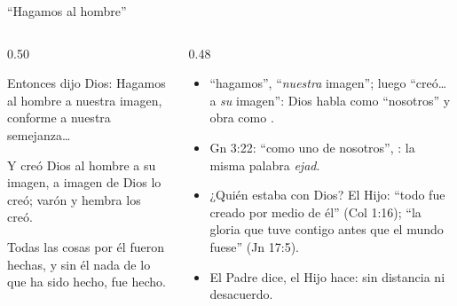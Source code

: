 \begin{frame}{``Hagamos al hombre''}
\begin{columns}[t,onlytextwidth]
\begin{column}{0.50\textwidth}
\begin{center}\small{}\end{center}
\begin{cita}[fontupper=\scriptsize\itshape]Entonces dijo Dios: Hagamos al hombre a nuestra imagen, conforme a nuestra semejanza\ldots{}\end{cita}
\begin{cita}[fontupper=\scriptsize\itshape]Y creó Dios al hombre a su imagen, a imagen de Dios lo creó; varón y hembra los creó.\end{cita}
\begin{cita}[fontupper=\scriptsize\itshape]Todas las cosas por él fueron hechas, y sin él nada de lo que ha sido hecho, fue hecho.\end{cita}
\end{column}
\begin{column}{0.48\textwidth}\small
\begin{itemize}
\item {} ``hagamos'', ``\emph{nuestra} imagen''; luego ``creó\ldots{} a \emph{su} imagen'': Dios habla como ``nosotros'' y obra como .
\item Gn 3:22: ``como uno de nosotros'', : la misma palabra \emph{ejad}.
\item ¿Quién estaba con Dios? El Hijo: ``todo fue creado por medio de él'' (Col 1:16); ``la gloria que tuve contigo antes que el mundo fuese'' (Jn 17:5).
\item El Padre dice, el Hijo hace: sin distancia ni desacuerdo.
\end{itemize}
\end{column}
\end{columns}\par\smallskip
{}
\end{frame}

